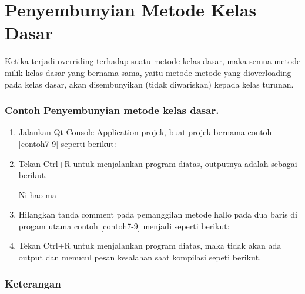 \section{Penyembunyian Metode Kelas Dasar}\label{penyembunyian-metode-kelas-dasar}

Ketika terjadi overriding terhadap suatu metode kelas dasar, maka semua
metode milik kelas dasar yang bernama sama, yaitu metode-metode yang
dioverloading pada kelas dasar, akan disembunyikan (tidak diwariskan)
kepada kelas turunan.

\subsubsection*{Contoh Penyembunyian metode kelas dasar.}

\begin{enumerate}

\item
 Jalankan Qt Console Application projek, buat projek bernama contoh
 \ref{contoh7-9} seperti berikut:



\item
 Tekan Ctrl+R untuk menjalankan program diatas, outputnya adalah
 sebagai berikut.


\begin{lcverbatim}
Ni hao ma
\end{lcverbatim}


\item
 Hilangkan tanda comment pada pemanggilan metode hallo pada dua baris
 di progam utama contoh \ref{contoh7-9} menjadi seperti berikut:



\item
 Tekan Ctrl+R untuk menjalankan program diatas, maka tidak akan ada
 output dan menucul pesan kesalahan saat kompilasi sepeti berikut.
\end{enumerate}

\begin{figure}[htbp]
\centering
{}

\end{figure}

\subsubsection*{Keterangan}

